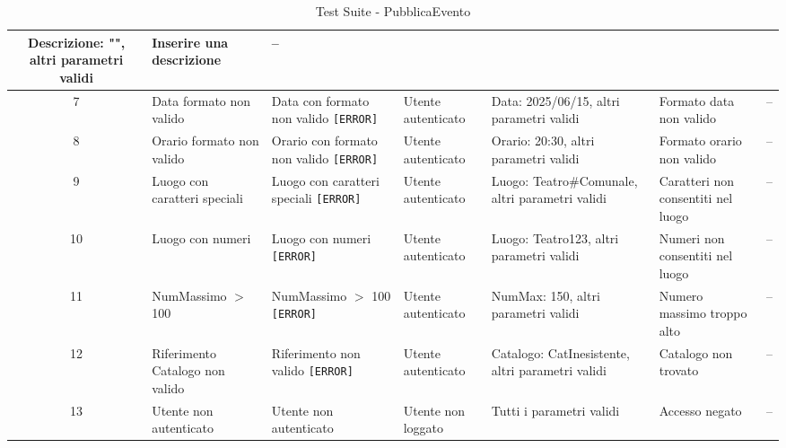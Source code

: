 \begin{table}[H]
\begin{tabular}{|c|p{2.5cm}|p{2.8cm}|p{1.5cm}|p{2.8cm}|p{2cm}|p{1.8cm}|}
		Descrizione: "", altri parametri validi &
		Inserire una descrizione & -- \\
		\hline
		7 & Data formato non valido & Data con formato non valido \texttt{[ERROR]} & Utente autenticato &
		Data: 2025/06/15, altri parametri validi &
		Formato data non valido & -- \\
		\hline
		8 & Orario formato non valido & Orario con formato non valido \texttt{[ERROR]} & Utente autenticato &
		Orario: 20:30, altri parametri validi &
		Formato orario non valido & -- \\
		\hline
		9 & Luogo con caratteri speciali & Luogo con caratteri speciali \texttt{[ERROR]} & Utente autenticato &
		Luogo: Teatro\#Comunale, altri parametri validi &
		Caratteri non consentiti nel luogo & -- \\
		\hline
		10 & Luogo con numeri & Luogo con numeri \texttt{[ERROR]} & Utente autenticato &
		Luogo: Teatro123, altri parametri validi &
		Numeri non consentiti nel luogo & -- \\
		\hline
		11 & NumMassimo $>$ 100 & NumMassimo $>$ 100 \texttt{[ERROR]} & Utente autenticato &
		NumMax: 150, altri parametri validi &
		Numero massimo troppo alto & -- \\
		\hline
		12 & Riferimento Catalogo non valido & Riferimento non valido \texttt{[ERROR]} & Utente autenticato &
		Catalogo: CatInesistente, altri parametri validi &
		Catalogo non trovato & -- \\
		\hline
		13 & Utente non autenticato & Utente non autenticato & Utente non loggato &
		Tutti i parametri validi &
		Accesso negato & -- \\
		\hline
	\end{tabular}
	\caption{Test Suite - PubblicaEvento}
\end{table}